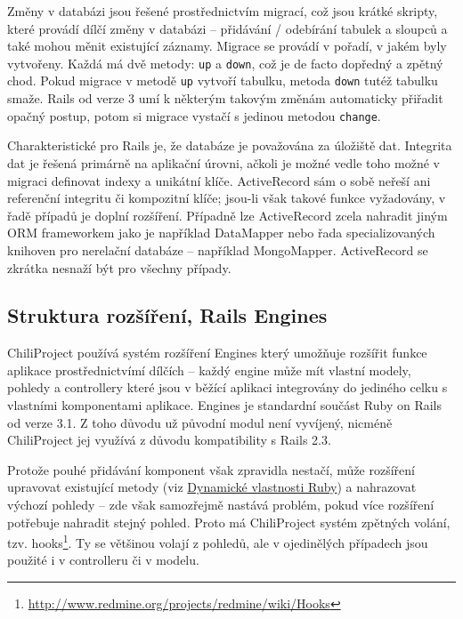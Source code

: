 \documentclass[thesis=B,czech]{FITthesis}[2012/05/02]
\begin{document}
Změny v databázi jsou řešené prostřednictvím migrací, což jsou krátké
skripty, které provádí dílčí změny v databázi -- přidávání / odebírání
tabulek a sloupců a také mohou měnit existující záznamy. Migrace se
provádí v pořadí, v jakém byly vytvořeny. Každá má dvě metody:
\lstinline!up! a \lstinline!down!, což je de facto dopředný a zpětný
chod. Pokud migrace v metodě \lstinline!up! vytvoří tabulku, metoda
\lstinline!down! tutéž tabulku smaže. Rails od verze 3 umí k některým
takovým změnám automaticky přiřadit opačný postup, potom si migrace
vystačí s jedinou metodou \lstinline!change!.

Charakteristické pro Rails je, že databáze je považována za 
úložiště dat. Integrita dat je řešená primárně na aplikační úrovni,
ačkoli je možné vedle toho možné v migraci definovat indexy a unikátní
klíče. ActiveRecord sám o sobě neřeší ani referenční integritu či
kompozitní klíče; jsou-li však takové funkce vyžadovány, v řadě případů
je doplní rozšíření. Případně lze ActiveRecord zcela nahradit jiným ORM
frameworkem jako je například DataMapper nebo řada specializovaných
knihoven pro nerelační databáze -- například MongoMapper. ActiveRecord
se zkrátka nesnaží být  pro všechny případy.

\subsection{Struktura rozšíření, Rails Engines}

ChiliProject používá systém rozšíření Engines který umožňuje rozšířit
funkce aplikace prostřednictvímí dílčích  -- každý
engine může mít vlastní modely, pohledy a controllery které jsou v
běžící aplikaci integrovány do jediného celku s vlastními komponentami
aplikace. Engines je standardní součást Ruby on Rails od verze 3.1. Z
toho důvodu už původní modul není vyvíjený, nicméně ChiliProject jej
využívá z důvodu kompatibility s Rails 2.3.

Protože pouhé přidávání komponent však zpravidla nestačí, může rozšíření
upravovat existující metody (viz
\href{\#dynamicke-vlastnosti-jazyka-ruby}{Dynamické vlastnosti Ruby}) a
nahrazovat výchozí pohledy -- zde však samozřejmě nastává problém, pokud
více rozšíření potřebuje nahradit stejný pohled. Proto má ChiliProject
systém zpětných volání, tzv. hooks\footnote{\url{http://www.redmine.org/projects/redmine/wiki/Hooks}}.
Ty se většinou volají z pohledů, ale v ojedinělých případech jsou
použité i v controlleru či v modelu.
\end{document}

